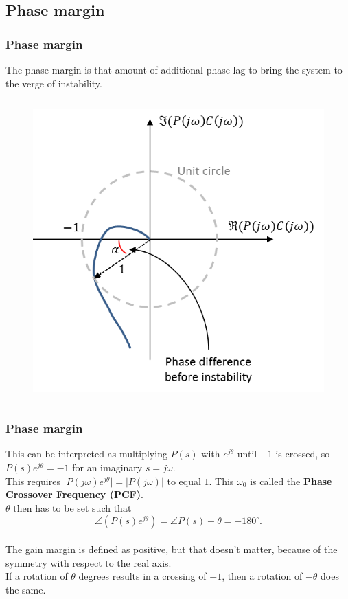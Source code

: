 \subsection{Phase margin}

\begin{frame}
	\frametitle{Phase margin}
	The phase margin is that amount of additional phase lag to bring the system to the verge of instability. 
	\vspace{-3ex}
	\begin{columns}
		
		\begin{figure}
			\includegraphics[width=0.6\linewidth]{phase_margin}
		\end{figure}
	\end{columns}
\end{frame}

\begin{frame}
	\frametitle{Phase margin}
	This can be interpreted as multiplying $P(s)$ with $e^{j\theta}$ until $-1$ is crossed, so $P(s)e^{j\theta}=-1$ for an imaginary $s=j\omega$.\\
	\medskip
	This requires $\big|P(j\omega)e^{j\theta}\big|=\big|P(j\omega)\big|$ to equal $1$. This $\omega_0$ is called the \textbf{Phase Crossover Frequency (PCF)}.\\
	$\theta$ then has to be set such that $$\angle(P(s)e^{j\theta})=\angle P(s) + \theta = -180^{\circ}.$$\\
	The gain margin is defined as positive, but that doesn't matter, because of the symmetry with respect to the real axis.\\
	If a rotation of $\theta$ degrees results in a crossing of $-1$, then a rotation of $-\theta$ does the same.
\end{frame}

